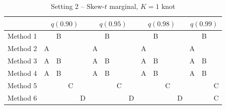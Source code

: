 \documentclass[useAMS,usenatbib,referee]{biomweb}
\begin{document}

\begin{table}[htbp]
  \centering
  \caption{Setting 2 -- Skew-$t$ marginal, $K = 1$ knot}
  \label{sttbl:st1sim}
  \begin{tabular}{|l|cccc|cccc|cccc|ccc|}
    \cline{2-16}
    \multicolumn{1}{c}{} & \multicolumn{4}{|c}{$q(0.90)$} & \multicolumn{4}{|c}{$q(0.95)$} & \multicolumn{4}{|c}{$q(0.98)$} & \multicolumn{3}{|c|}{$q(0.99)$} \\
    \hline
    Method 1 &   & B &   &   &   & B &   &   &   & B &   &   &   & B &   \\
    \hline
    Method 2 & A &   &   &   & A &   &   &   & A &   &   &   & A &   &   \\
    \hline
    Method 3 & A & B &   &   & A & B &   &   & A & B &   &   & A & B &   \\
    \hline
    Method 4 & A & B &   &   & A & B &   &   & A & B &   &   & A & B &   \\
    \hline
    Method 5 &   &   & C &   &   &   & C &   &   &   & C &   &   &   & C \\
    \hline
    Method 6 &   &   &   & D &   &   &   & D &   &   &   & D &   &   & C \\
    \hline
  \end{tabular}
\end{table}
\end{document}
